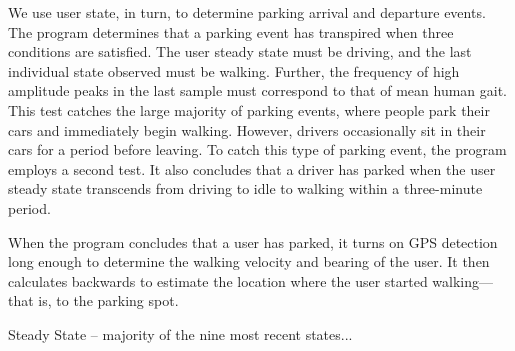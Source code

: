 
We use user state, in turn, to determine parking arrival and departure
events. The program determines that a parking event has transpired when
three conditions are satisfied. The user steady state must be driving, and
the last individual state observed must be walking. Further, the frequency
of high amplitude peaks in the last sample must correspond to that of mean
human gait. This test catches the large majority of parking events, where
people park their cars and immediately begin walking. However, drivers
occasionally sit in their cars for a period before leaving. To catch this
type of parking event, the program employs a second test. It also concludes
that a driver has parked when the user steady state transcends from driving
to idle to walking within a three-minute period.

When the program concludes that a user has parked, it turns on GPS detection
long enough to determine the walking velocity and bearing of the user. It
then calculates backwards to estimate the location where the user started
walking---that is, to the parking spot.

Steady State – majority of the nine most recent states...

